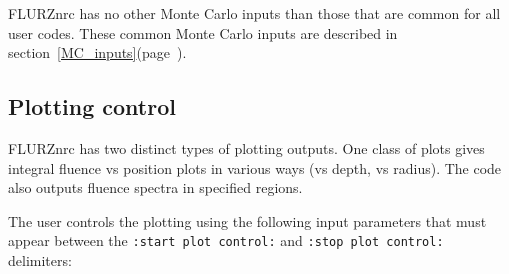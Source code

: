 \documentclass[12pt,twoside]{article}  %
\newcommand{\lpage}[1]{(page~\pageref{#1})}
\begin{document}
FLURZnrc has no other Monte Carlo inputs than those that are common
for all user codes.  These common Monte Carlo inputs are described
in section~\ref{MC_inputs}\lpage{MC_inputs}.

\subsection{Plotting control}

FLURZnrc has two distinct types of plotting outputs. One class of plots
gives integral fluence vs position plots in various ways (vs depth, vs
radius).  The code also outputs fluence spectra in specified regions.

The user controls the plotting using the
following input parameters that must appear between the
{\tt :start plot control:} and {\tt :stop plot control:} delimiters:
\end{document}
